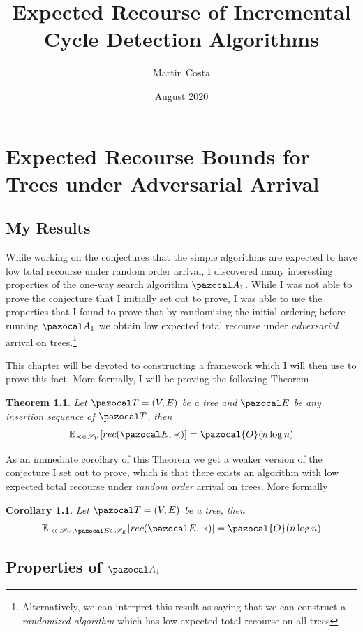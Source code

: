 \documentclass{report}
\title{Expected Recourse of Incremental Cycle Detection Algorithms}
\author{Martin Costa}
\date{August 2020}
\newtheorem{theorem}{Theorem}
\newtheorem{corollary}{Corollary}
\begin{document}
\maketitle

\chapter{Expected Recourse Bounds for Trees under Adversarial Arrival}

\section{My Results}

While working on the conjectures that the simple algorithms are expected to have low total recourse under random order arrival, I discovered many interesting properties of the one-way search algorithm $\pazocal A_1$. While I was not able to prove the conjecture that I initially set out to prove, I was able to use the properties that I found to prove that by randomising the initial ordering before running $\pazocal A_1$ we obtain low expected total recourse under \textit{adversarial} arrival on trees.\footnote{Alternatively, we can interpret this result as saying that we can construct a \textit{randomized algorithm} which has low expected total recourse on all trees}

This chapter will be devoted to constructing a framework which I will then use to prove this fact. More formally, I will be proving the following Theorem

\begin{theorem}
Let $\pazocal T = (V,E)$ be a tree and $\pazocal E$ be any insertion sequence of $\pazocal T$, then
\[ \mathbb{E}_{\prec \in \mathcal S_V}[ rec(\pazocal E, \prec)] = \pazocal{O}(n\log n) \]
\end{theorem}

As an immediate corollary of this Theorem we get a weaker version of the conjecture I set out to prove, which is that there exists an algorithm with low expected total recourse under \textit{random order} arrival on trees. More formally

\begin{corollary}
Let $\pazocal T = (V,E)$ be a tree, then
\[ \mathbb{E}_{\prec \in \mathcal S_V, \pazocal E \in \mathcal S_E}[ rec(\pazocal E, \prec)] = \pazocal{O}(n\log n) \]
\end{corollary}

\section{Properties of $\pazocal A_1$}
\end{document}
